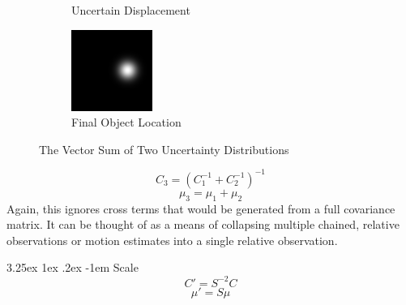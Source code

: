 \documentclass{article}
\makeatletter
\renewcommand\paragraph{\@startsection{paragraph}{5}{\z@}%
  {3.25ex \@plus1ex \@minus.2ex}%
  {-1em}%
  {\normalfont\normalsize\bfseries}}
\makeatother
\begin{document}
\begin{figure}
\begin{subfigure}{.3\textwidth}
          \caption{Uncertain Displacement}
          \label{fig:vectSumsub2}
        \end{subfigure}
        \begin{subfigure}{.3\textwidth}
          \centering
          \includegraphics[width=.8\linewidth]{images/GaussianSum3.png}
          \caption{Final Object Location}
          \label{fig:vectSumsub3}
        \end{subfigure}
        \caption{The Vector Sum of Two Uncertainty Distributions}
        \label{fig:vectSum}
        \end{figure}
        \begin{equation}
        C_3 = (C_1^{-1} + C_2^{-1})^{-1}
        \end{equation}
        \begin{equation}
        \mu_3 = \mu_1 + \mu_2
        \end{equation}
        Again, this ignores cross terms that would be generated from a full covariance matrix.  It can be thought of as a means of collapsing multiple chained, relative observations or motion estimates into a single relative observation.

        \paragraph{Scale}
        \begin{equation}
        C' = S^{-2} C
        \end{equation}
        \begin{equation}
        \mu' = S \mu
        \end{equation}
\end{document}

